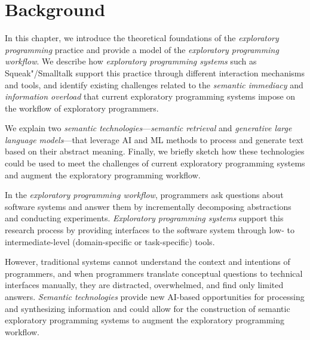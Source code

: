 
\chapter{Background}
\label{cha:background}

In this chapter, we introduce the theoretical foundations of the \emph{exploratory programming} practice and provide a model of the \emph{exploratory programming workflow}.
We describe how \emph{exploratory programming systems} such as Squeak"/Smalltalk support this practice through different interaction mechanisms and tools, and identify existing challenges related to the \emph{semantic immediacy} and \emph{information overload} that current exploratory programming systems impose on the workflow of exploratory programmers.

We explain two \emph{semantic technologies}---\emph{semantic retrieval} and \emph{generative large language models}---that leverage AI and ML methods to process and generate text based on their abstract meaning.
Finally, we briefly sketch how these technologies could be used to meet the challenges of current exploratory programming systems and augment the exploratory programming workflow.


\begin{summary}
	In the \emph{exploratory programming workflow}, programmers ask questions about software systems and answer them by incrementally decomposing abstractions and conducting experiments.
	\emph{Exploratory programming systems} support this research process by providing interfaces to the software system through low- to intermediate-level (domain-specific or task-specific) tools.

	However, traditional systems cannot understand the context and intentions of programmers, and when programmers translate conceptual questions to technical interfaces manually, they are distracted, overwhelmed, and find only limited answers.
	\emph{Semantic technologies} provide new AI-based opportunities for processing and synthesizing information and could allow for the construction of semantic exploratory programming systems to augment the exploratory programming workflow.
\end{summary}
